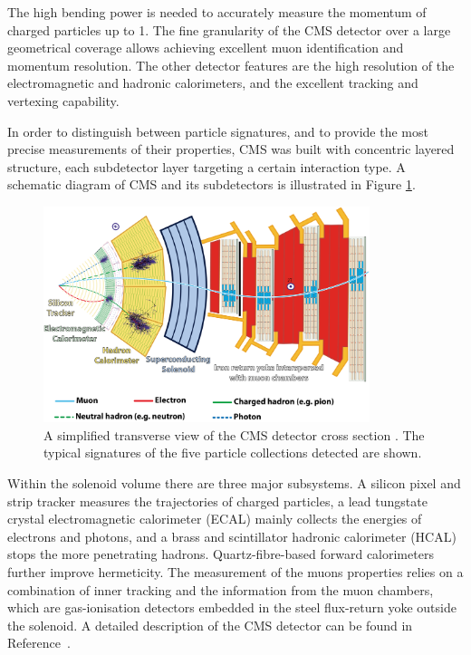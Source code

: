 The high bending power is needed to accurately measure the momentum of charged particles up to 1\TeV.
The fine granularity of the CMS detector over a large geometrical coverage allows achieving excellent muon identification and momentum resolution.
The other detector features are the high resolution of the electromagnetic and hadronic calorimeters, and the excellent tracking and vertexing capability.

In order to distinguish between particle signatures, and to provide the most precise measurements of their properties,
CMS was built with concentric layered structure, each subdetector layer targeting a certain interaction type.
A schematic diagram of CMS and its subdetectors is illustrated in Figure \ref{fig:CMSslice}.

\begin{figure}[htb]
\begin{center}
\includegraphics[width=0.85\textwidth]{Figures/CMSslice_whiteBackground.png}
\end{center}
\caption{A simplified transverse view of the CMS detector cross section \cite{CMS-PHO-GEN-2016-001}. The typical signatures of the five particle collections detected are shown.}
\label{fig:CMSslice}
\end{figure}

Within the solenoid volume there are three major subsystems.
A silicon pixel and strip tracker measures the trajectories of charged particles,
a lead tungstate crystal electromagnetic calorimeter (ECAL) mainly collects the energies of electrons and photons,
and a brass and scintillator hadronic calorimeter (HCAL) stops the more penetrating hadrons.
Quartz-fibre-based forward calorimeters further improve hermeticity.
The measurement of the muons properties relies on a combination of inner tracking and the information from the muon chambers,
which are gas-ionisation detectors embedded in the steel flux-return yoke outside the solenoid.
A detailed description of the CMS detector can be found in Reference~\cite{CMS:2008}.

